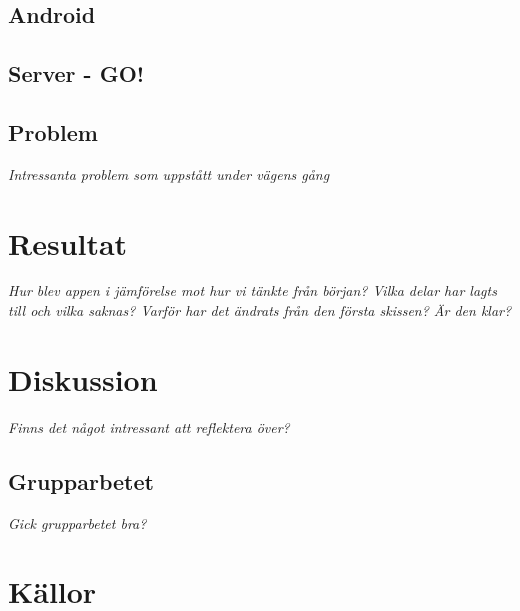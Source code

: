 \documentclass[11pt,a4paper]{article}
\begin{document}
\subsection{Android}

\subsection{Server - GO!}

\subsection{Problem}
\textit{Intressanta problem som uppstått under vägens gång}

\section{Resultat}
\textit{Hur blev appen i jämförelse mot hur vi tänkte från början? Vilka delar har lagts till och vilka saknas? Varför har det ändrats från den första skissen? Är den klar?}

\section{Diskussion}
\textit{Finns det något intressant att reflektera över?}

\subsection{Grupparbetet}
\textit{Gick grupparbetet bra?}

\section{Källor}
\appendix
\end{document}
